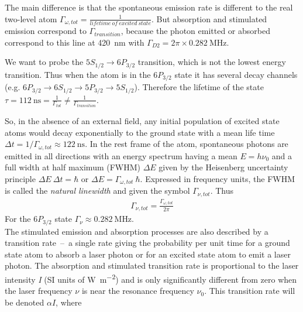 The main difference is that the spontaneous emission rate is different 
to the real two-level atom 
\(\Gamma_{\omega,tot} = \frac{1}{lifetime~of~excited~state} \). But absorption 
and stimulated emission correspond to \(\Gamma_{transition} \), because the photon
emitted or absorbed correspond to this line at \SI{420}{\nano\meter} with
\(\Gamma_{D2} = 2\pi\times\SI{0.282}{\mega\hertz} \).

We want to probe the \(5S_{1/2}\rightarrow 6P_{3/2}\) transition, which is not
the lowest energy transition. Thus when the atom is in the \(6P_{3/2} \) state
it has several decay channels 
(e.g. \(6P_{3/2}\rightarrow 6S_{1/2} \rightarrow 5P_{3/2} \rightarrow 5S_{1/2}\)). 
Therefore the lifetime of the state 
\(\tau=\SI{112}{\nano\second}=\frac{1}{\Gamma_{tot}}\neq\frac{1}{\Gamma_{transition}} \).

\bigskip
So, in the absence of an external field, any initial population of excited state 
atoms would decay exponentially to the ground state with a mean life time 
\(\Delta t = 1/\Gamma_{\omega,tot} \approx \SI{122}{\nano\second} \). In the rest 
frame of the atom, spontaneous photons are emitted in all directions with an energy 
spectrum having a mean \(E=h\nu_0 \) and a full width at half maximum (FWHM) 
\(\Delta E \) given by the Heisenberg uncertainty principle \(\Delta E~\Delta t=\hbar \) 
or \(\Delta E = \Gamma_{\omega,tot}~\hbar \). Expressed in frequency units, the 
FWHM is called the \textit{natural linewidth} and given the symbol \(\Gamma_{\nu,tot} \). 
Thus
\begin{align}\label{eq:gamma_relation}
    \Gamma_{\nu,tot} = \frac{\Gamma_{\omega,tot}}{2\pi}
\end{align}
For the \( 6P_{3/2} \) state \(\Gamma_\nu\approx \SI{0.282}{\mega\hertz} \). \\ 
The stimulated emission and absorption processes are also described by a transition 
rate~--~a single rate giving the probability per unit time for a ground state atom 
to absorb a laser photon or for an excited state atom to emit a laser photon. The 
absorption and stimulated transition rate is proportional to the laser intensity 
\textit{I} (SI units of \si{\watt\per\meter\squared}) and is only significantly 
different from zero when the laser frequency \(\nu \) is near the resonance 
frequency \(\nu_0 \). This transition rate will be denoted \(\alpha I \), where 

